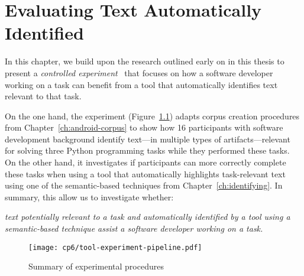 \setcounter{chapter}{5}
\setcounter{rq}{1}


\chapter{Evaluating Text Automatically Identified}
\label{ch:assisting}




In this chapter, we build upon the research outlined  early on in this thesis to
present a \textit{controlled experiment}~\cite{Lazar2017-cp2} that focuses on how  a
software developer working on a task can benefit from a tool that automatically identifies text 
relevant to that task.



On the one hand, 
the experiment (Figure~\ref{fig:tool-experiment-procedures})
adapts corpus creation procedures from Chapter~\ref{ch:android-corpus}
to show how 16 participants with software development background identify 
text---in multiple types of artifacts---relevant for solving three Python programming tasks while they performed these tasks. %
On the other hand, 
it investigates if participants can more correctly complete these tasks 
when using a tool 
that  automatically highlights 
task-relevant text using one of the semantic-based techniques 
from Chapter~\ref{ch:identifying}. 
In summary, this allow us to investigate whether:

\medskip
\begin{bluequote}
    \textit{text potentially relevant to a task and automatically identified  by a tool using a semantic-based technique assist a software developer working on a task.}
\end{bluequote}



\begin{figure}
    \centering
    \texttt{[image: cp6/tool-experiment-pipeline.pdf]}
    \caption{Summary of experimental procedures}
    \label{fig:tool-experiment-procedures}
\end{figure}




